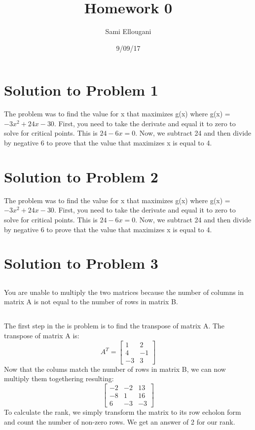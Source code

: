 \documentclass[a4paper]{article}
\title{Homework 0}
\author{Sami Ellougani}
\date{9/09/17}
\begin{document}
\lstset{language=Python}

\maketitle

\section{Solution to Problem 1}
The problem was to find the value for x that maximizes g(x) where g(x) = $-3x^2 + 24x - 30$. First, you need to 
take the derivate and equal it to zero to solve for critical points. This is $24-6x = 0$. Now, we subtract 24 and then divide by negative
6 to prove that the value that maximizes x is equal to 4.

\section{Solution to Problem 2}
The problem was to find the value for x that maximizes g(x) where g(x) = $-3x^2 + 24x - 30$. First, you need to 
take the derivate and equal it to zero to solve for critical points. This is $24-6x = 0$. Now, we subtract 24 and then divide by negative
6 to prove that the value that maximizes x is equal to 4.

\section{Solution to Problem 3}
\subsection{} 
You are unable to multiply the two matrices because the number of columns in matrix A is not equal to the number of rows in matrix B.
\subsection{}
The first step in the is problem is to find the transpose of matrix A. The transpose of matrix A is:
\[
A^T=
  \begin{bmatrix}
    1 & 2  \\
    4 & -1 \\
   -3 & 3
  \end{bmatrix}
\]
Now that the colums match the number of rows in matrix B, we can now multiply them togethering resulting:
\[
  \begin{bmatrix}
    -2 & -2 & 13 \\
    -8 & 1 & 16 \\
    6 & -3 & -3
  \end{bmatrix}
\]
To calculate the rank, we simply transform the matrix to its row echolon form and count the number of non-zero rows. We get an answer of 2 for our rank.
\end{document}
